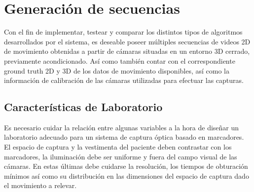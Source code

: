 \section{Generación de secuencias} 
\label{section_base_de_datos}
Con el fin de implementar, testear y comparar los distintos tipos de algoritmos desarrollados por el sistema, es deseable poseer  múltiples secuencias de videos 2D de movimiento obtenidas a partir de cámaras situadas en un entorno 3D cerrado, previamente acondicionado. Así como también contar con el correspondiente ground truth 2D y 3D de los datos de movimiento disponibles, así como la información de calibración de las cámaras utilizadas para efectuar las capturas.

\subsection{Características de Laboratorio}
\label{seccion_Caracteristicas_Laboratorio}
Es necesario cuidar la relación entre algunas variables a la hora de diseñar un laboratorio adecuado para un sistema de captura óptica basado en marcadores. El espacio de captura y la vestimenta del paciente deben contrastar con los marcadores, la iluminación debe ser uniforme y fuera del campo visual de las cámaras. En estas últimas debe cuidarse la resolución, los tiempos de obturación mínimos así como su distribución en las dimensiones del espacio de captura dado el movimiento a relevar.
%

